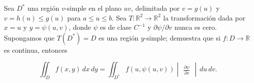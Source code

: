 Sea \( D^* \) una región \( v \)-simple en el plano \( uv \), delimitada por \( v = g(u) \) y \( v = h(u) \leq g(u) \) para \( a \leq u \leq b \). Sea \( T:\mathbb{R}^2 \to \mathbb{R}^2 \) la transformación dada por \( x = u \) y \( y = \psi(u, v) \), donde \( \psi \) es de clase \( C^{-1} \) y \( \partial \psi / \partial v \) nunca es cero. Supongamos que \( T(D^*) = D \) es una región \( y \)-simple; demuestra que si \( f: D \to \mathbb{R} \) es continua, entonces

\[
\iint_D f(x, y) \, dx \, dy = \iint_{D^*} f(u, \psi(u, v)) \begin{vmatrix}
    \frac{\partial \psi}{\partial v}
\end{vmatrix} \, du \, dv.
\]
